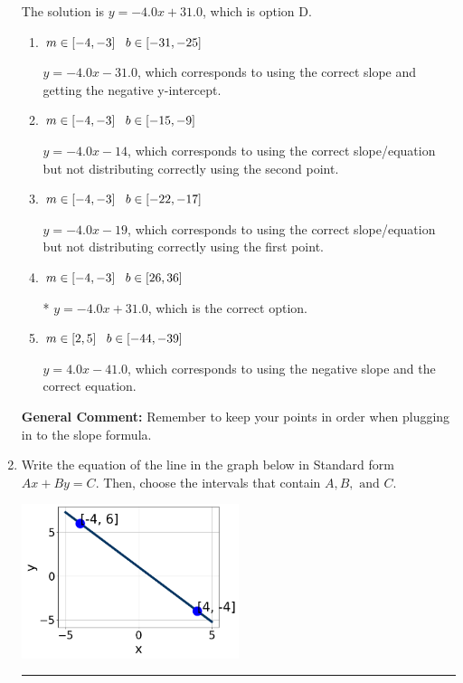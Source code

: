 \documentclass{extbook}[14pt]
\newcommand{\litem}[1]{\item #1

\rule{\textwidth}{0.4pt}}
\begin{document}
\begin{enumerate}
{The solution is \( y = -4.0x + 31.0 \), which is option D.\begin{enumerate}[label=\Alph*.]
\item \( m \in [-4, -3] \hspace*{3mm} b \in [-31, -25] \)

 $y = -4.0x -31.0$, which corresponds to using the correct slope and getting the negative y-intercept.
\item \( m \in [-4, -3] \hspace*{3mm} b \in [-15, -9] \)

 $y = -4.0x -14$, which corresponds to using the correct slope/equation but not distributing correctly using the second point.
\item \( m \in [-4, -3] \hspace*{3mm} b \in [-22, -17] \)

 $y = -4.0x -19$, which corresponds to using the correct slope/equation but not distributing correctly using the first point.
\item \( m \in [-4, -3] \hspace*{3mm} b \in [26, 36] \)

* $y = -4.0x + 31.0$, which is the correct option.
\item \( m \in [2, 5] \hspace*{3mm} b \in [-44, -39] \)

 $y = 4.0x -41.0$, which corresponds to using the negative slope and the correct equation.
\end{enumerate}

\textbf{General Comment:} Remember to keep your points in order when plugging in to the slope formula.
}
\litem{
Write the equation of the line in the graph below in Standard form $Ax+By=C$. Then, choose the intervals that contain $A, B, \text{ and } C$.

\begin{center}
    \includegraphics[width=0.5\textwidth]{../Figures/linearGraphToStandardCopyC.png}
\end{center}




}
\end{enumerate}
\end{document}
